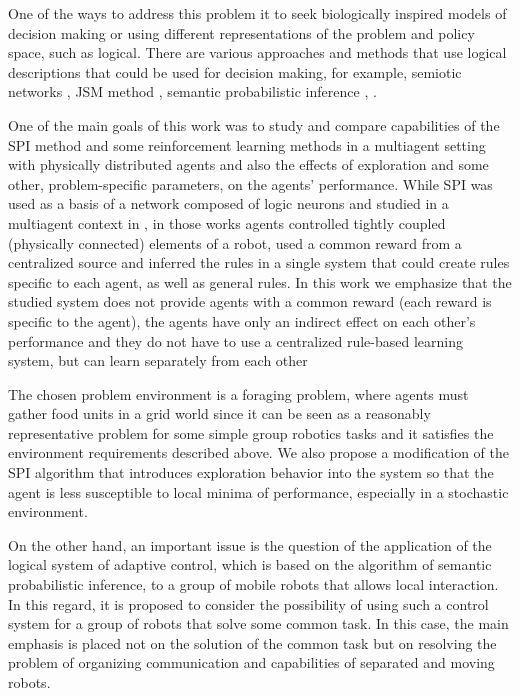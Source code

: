\documentclass[a4paper,twocolumn]{article}
\begin{document}
One of the ways to address this problem it to seek
biologically inspired models of decision making or using
different representations of the problem and policy space,
such as logical. There are various approaches and methods that use logical descriptions that could be used for
decision making, for example, semiotic networks \cite{10},
JSM method \cite{2}, semantic probabilistic inference \cite{7}, \cite{9}.

One of the main goals of this work was to study
and compare capabilities of the SPI method and some
reinforcement learning methods in a multiagent setting
with physically distributed agents and also the effects of
exploration and some other, problem-specific parameters,
on the agents’ performance. While SPI was used as
a basis of a network composed of logic neurons and
studied in a multiagent context in \cite{1}, in those works
agents controlled tightly coupled (physically connected)
elements of a robot, used a common reward from a
centralized source and inferred the rules in a single
system that could create rules specific to each agent, as
well as general rules. In this work we emphasize that the
studied system does not provide agents with a common
reward (each reward is specific to the agent), the agents
have only an indirect effect on each other’s performance
and they do not have to use a centralized rule-based
learning system, but can learn separately from each other

The chosen problem environment is a foraging problem, where agents must gather food units in a grid
world since it can be seen as a reasonably representative
problem for some simple group robotics tasks and it
satisfies the environment requirements described above.
We also propose a modification of the SPI algorithm
that introduces exploration behavior into the system so
that the agent is less susceptible to local minima of
performance, especially in a stochastic environment.

On the other hand, an important issue is the question of
the application of the logical system of adaptive control,
which is based on the algorithm of semantic probabilistic
inference, to a group of mobile robots that allows local
interaction. In this regard, it is proposed to consider the possibility of using such a control system for a group
of robots that solve some common task. In this case,
the main emphasis is placed not on the solution of the
common task but on resolving the problem of organizing
communication and capabilities of separated and moving
robots.
\end{document}
